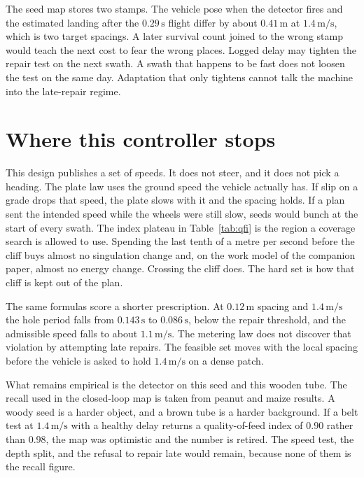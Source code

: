 \documentclass[11pt,a4paper]{article}
\begin{document}
The seed map stores two stamps. The vehicle pose when the detector fires and the estimated landing after the \(0.29\,\mathrm{s}\) flight differ by about \(0.41\,\mathrm{m}\) at \(1.4\,\mathrm{m/s}\), which is two target spacings. A later survival count joined to the wrong stamp would teach the next cost to fear the wrong places. Logged delay may tighten the repair test on the next swath. A swath that happens to be fast does not loosen the test on the same day. Adaptation that only tightens cannot talk the machine into the late-repair regime.

\section{Where this controller stops}
This design publishes a set of speeds. It does not steer, and it does not pick a heading. The plate law uses the ground speed the vehicle actually has. If slip on a grade drops that speed, the plate slows with it and the spacing holds. If a plan sent the intended speed while the wheels were still slow, seeds would bunch at the start of every swath. The index plateau in Table~\ref{tab:qfi} is the region a coverage search is allowed to use. Spending the last tenth of a metre per second before the cliff buys almost no singulation change and, on the work model of the companion paper, almost no energy change. Crossing the cliff does. The hard set is how that cliff is kept out of the plan.

The same formulas score a shorter prescription. At \(0.12\,\mathrm{m}\) spacing and \(1.4\,\mathrm{m/s}\) the hole period falls from \(0.143\,\mathrm{s}\) to \(0.086\,\mathrm{s}\), below the repair threshold, and the admissible speed falls to about \(1.1\,\mathrm{m/s}\). The metering law does not discover that violation by attempting late repairs. The feasible set moves with the local spacing before the vehicle is asked to hold \(1.4\,\mathrm{m/s}\) on a dense patch.

What remains empirical is the detector on this seed and this wooden tube. The recall used in the closed-loop map is taken from peanut and maize results. A woody seed is a harder object, and a brown tube is a harder background. If a belt test at \(1.4\,\mathrm{m/s}\) with a healthy delay returns a quality-of-feed index of \(0.90\) rather than \(0.98\), the map was optimistic and the number is retired. The speed test, the depth split, and the refusal to repair late would remain, because none of them is the recall figure.
\end{document}
